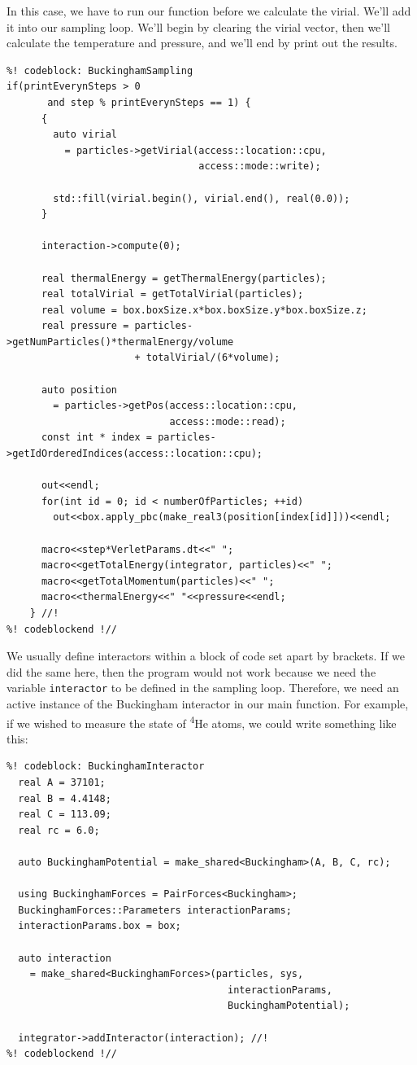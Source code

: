 In this case, we have to run our function before we calculate the virial. We'll 
add it into our sampling loop. We'll begin by clearing the virial vector, then 
we'll calculate the temperature and pressure, and we'll end by print out the 
results.
\begin{lstlisting}
%! codeblock: BuckinghamSampling
if(printEverynSteps > 0
       and step % printEverynSteps == 1) {
      {
        auto virial
          = particles->getVirial(access::location::cpu,
                                 access::mode::write);

        std::fill(virial.begin(), virial.end(), real(0.0));
      }

      interaction->compute(0);

      real thermalEnergy = getThermalEnergy(particles);
      real totalVirial = getTotalVirial(particles);
      real volume = box.boxSize.x*box.boxSize.y*box.boxSize.z;
      real pressure = particles->getNumParticles()*thermalEnergy/volume
                      + totalVirial/(6*volume);

      auto position
        = particles->getPos(access::location::cpu,
                            access::mode::read);
      const int * index = particles->getIdOrderedIndices(access::location::cpu);

      out<<endl;
      for(int id = 0; id < numberOfParticles; ++id)
        out<<box.apply_pbc(make_real3(position[index[id]]))<<endl;

      macro<<step*VerletParams.dt<<" ";
      macro<<getTotalEnergy(integrator, particles)<<" ";
      macro<<getTotalMomentum(particles)<<" ";
      macro<<thermalEnergy<<" "<<pressure<<endl;
    } //!
%! codeblockend !//
\end{lstlisting}
We usually define interactors within a block of code set apart by brackets. If 
we did the same here, then the program  would not work because we need the 
variable \texttt{interactor} to be defined in the sampling loop. Therefore, we 
need an active instance of the Buckingham interactor in our main function. For 
example, if we wished to measure the state of \textsuperscript{4}He atoms, we 
could write something like this:
\begin{lstlisting}
%! codeblock: BuckinghamInteractor
  real A = 37101;
  real B = 4.4148;
  real C = 113.09;
  real rc = 6.0;

  auto BuckinghamPotential = make_shared<Buckingham>(A, B, C, rc);

  using BuckinghamForces = PairForces<Buckingham>;
  BuckinghamForces::Parameters interactionParams;
  interactionParams.box = box;

  auto interaction
    = make_shared<BuckinghamForces>(particles, sys,
                                      interactionParams,
                                      BuckinghamPotential);

  integrator->addInteractor(interaction); //!
%! codeblockend !//
\end{lstlisting}
